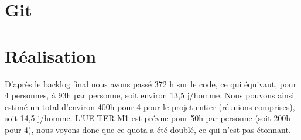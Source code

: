 \section{Git}


\section{Réalisation}
D'après le backlog final nous avons passé 372 h sur le code, ce qui équivaut, pour 4 personnes, à 93h par personne, soit environ 13,5 j/homme.
Nous pouvons ainsi estimé un total d'environ 400h pour 4 pour le projet entier (réunions comprises), soit 14,5 j/homme.
L'UE TER M1 est prévue pour 50h par personne (soit 200h pour 4), nous voyons donc que ce quota a été doublé, ce qui n'est pas étonnant.
